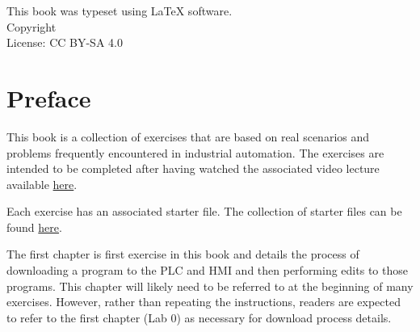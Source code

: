 \documentclass{book}
\makeatletter
\newcommand{\booklicense}{CC BY-SA 4.0}
\newcommand{\bookauthor}{\@author}
\makeatother
\begin{document}
\thispagestyle{empty}

\begin{flushleft}
\vspace*{\fill}
This book was typeset using \LaTeX{} software.\\
\vspace{\fill}
Copyright \textcopyright{} \the\year{}  \bookauthor\\
License: \booklicense
\end{flushleft}

\addtocounter{page}{2}

\chapter*{Preface}

This book is a collection of exercises that are based on real scenarios and problems frequently encountered in industrial automation. The exercises are intended to be completed after having watched the associated video lecture available \href{https://www.youtube.com/watch?v=DroUeHOe4lw&list=PL08zDkmLSnzFXJt9FVlfNPbG_KlcI_Qck&pp=gAQBiAQB}{here}. 

Each exercise has an associated starter file. The collection of starter files can be found \href{https://github.com/JesseTNRoberts/Introduction-to-PLC-Automation/}{here}.

The first chapter is first exercise in this book and details the process of downloading a program to the PLC and HMI and then performing edits to those programs. This chapter will likely need to be referred to at the beginning of many exercises. However, rather than repeating the instructions, readers are expected to refer to the first chapter (Lab 0) as necessary for download process details.

\setcounter{tocdepth}{3}
\tableofcontents

\mainmatter


















\backmatter
{}
\printindex
\end{document}
